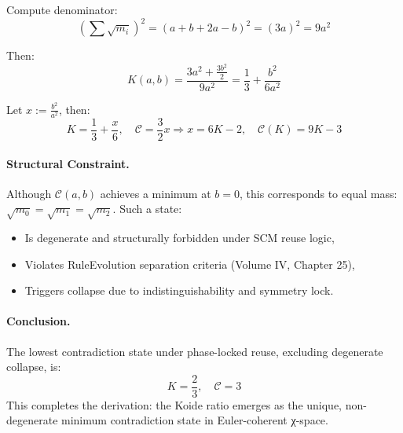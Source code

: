 Compute denominator:
\[
\left( \sum \sqrt{m_i} \right)^2 = (a + b + 2a - b)^2 = (3a)^2 = 9a^2
\]

Then:
\[
K(a, b) = \frac{3a^2 + \frac{3b^2}{2}}{9a^2} = \frac{1}{3} + \frac{b^2}{6a^2}
\]

Let $x := \frac{b^2}{a^2}$, then:
\[
K = \frac{1}{3} + \frac{x}{6},\quad
\mathcal{C} = \frac{3}{2}x \Rightarrow
x = 6K - 2,\quad
\mathcal{C}(K) = 9K - 3
\]

\paragraph{Structural Constraint.}
Although $\mathcal{C}(a, b)$ achieves a minimum at $b = 0$, this corresponds to equal mass: $\sqrt{m_0} = \sqrt{m_1} = \sqrt{m_2}$. Such a state:
\begin{itemize}
    \item Is degenerate and structurally forbidden under SCM reuse logic,
    \item Violates RuleEvolution separation criteria (Volume IV, Chapter 25),
    \item Triggers collapse due to indistinguishability and symmetry lock.
\end{itemize}

\paragraph{Conclusion.}
The lowest contradiction state under phase-locked reuse, excluding degenerate collapse, is:
\[
\boxed{
K = \frac{2}{3},\quad \mathcal{C} = 3
}
\]
This completes the derivation: the Koide ratio emerges as the unique, non-degenerate minimum contradiction state in Euler-coherent χ-space.
